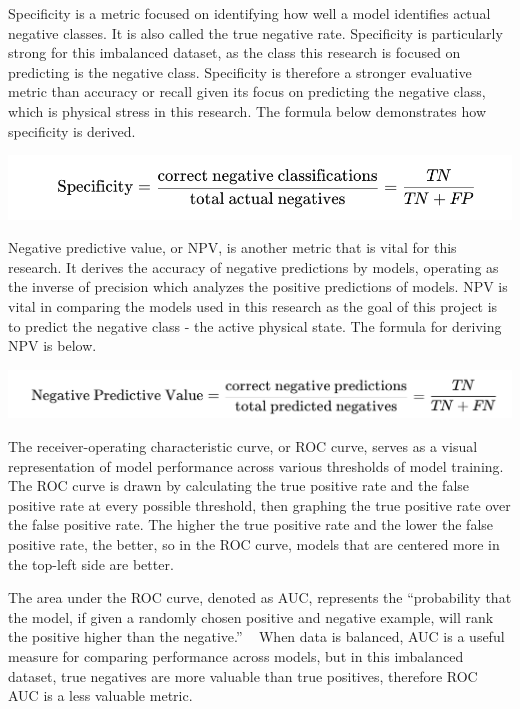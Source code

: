 \documentclass{article}
\begin{document}
Specificity is a metric focused on identifying how well a model identifies actual negative classes. It is also called the true negative rate. Specificity is particularly strong for this imbalanced dataset, as the class this research is focused on predicting is the negative class. Specificity is therefore a stronger evaluative metric than accuracy or recall given its focus on predicting the negative class, which is physical stress in this research. The formula below demonstrates how specificity is derived. 

\begin{center}
    \includegraphics[scale = .45]{images/specificity.png}
\end{center}

Negative predictive value, or NPV, is another metric that is vital for this research. It derives the accuracy of negative predictions by models, operating as the inverse of precision which analyzes the positive predictions of models. NPV is vital in comparing the models used in this research as the goal of this project is to predict the negative class - the active physical state. The formula for deriving NPV is below. 

\begin{center}
    \includegraphics[scale = .40]{images/NPV.png}
\end{center}

The receiver-operating characteristic curve, or ROC curve, serves as a visual representation of model performance across various thresholds of model training. The ROC curve is drawn by calculating the true positive rate and the false positive rate at every possible threshold, then graphing the true positive rate over the false positive rate. The higher the true positive rate and the lower the false positive rate, the better, so in the ROC curve, models that are centered more in the top-left side are better.

The area under the ROC curve, denoted as AUC, represents the “probability that the model, if given a randomly chosen positive and negative example, will rank the positive higher than the negative.” ~\cite{googleML} When data is balanced, AUC is a useful measure for comparing performance across models, but in this imbalanced dataset, true negatives are more valuable than true positives, therefore ROC AUC is a less valuable metric. 
\end{document}
